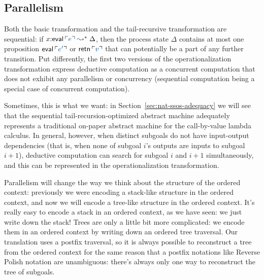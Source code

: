 
\subsection{Parallelism}
\label{sec:trans-par}

Both the basic transformation and the tail-recursive transformation
are sequential: if $x{:}{\sf eval}\,\interp{e} \leadsto^* \Delta$,
then the process state $\Delta$ contains at most one proposition ${\sf
  eval}\,\interp{e'}$ or ${\sf retn}\,\interp{v}$ that can potentially
be a part of any further transition. Put differently, the first two
versions of the operationalization transformation express deductive
computation as a concurrent computation that does not exhibit any
parallelism or concurrency (sequential computation being a special
case of concurrent computation).

Sometimes, this is what we want: in
Section~\ref{sec:nat-ssos-adequacy} we will see that the sequential
tail-recursion-optimized abstract machine 
adequately represents a traditional on-paper abstract machine for
the call-by-value lambda calculus. In general, however, when distinct
subgoals do not have input-output dependencies (that is, when none of
subgoal $i$'s outputs are inputs to subgoal $i+1$), deductive computation
can search for subgoal $i$ and $i+1$ simultaneously, and this can 
be represented in the operationalization transformation.

Parallelism will change the way we think about the structure of the
ordered context: previously we were encoding a stack-like structure in
the ordered context, and now we will encode a tree-like structure in
the ordered context. It's really easy to encode a stack in an ordered
context, as we have seen: we just write down the stack!  Trees are
only a little bit more complicated: we encode them in an ordered
context by writing down an ordered tree traversal. Our translation
uses a postfix traversal, so it is always possible to reconstruct a
tree from the ordered context for the same reason that a postfix
notations like Reverse Polish notation are unambiguous: there's always
only one way to reconstruct the tree of subgoals.

